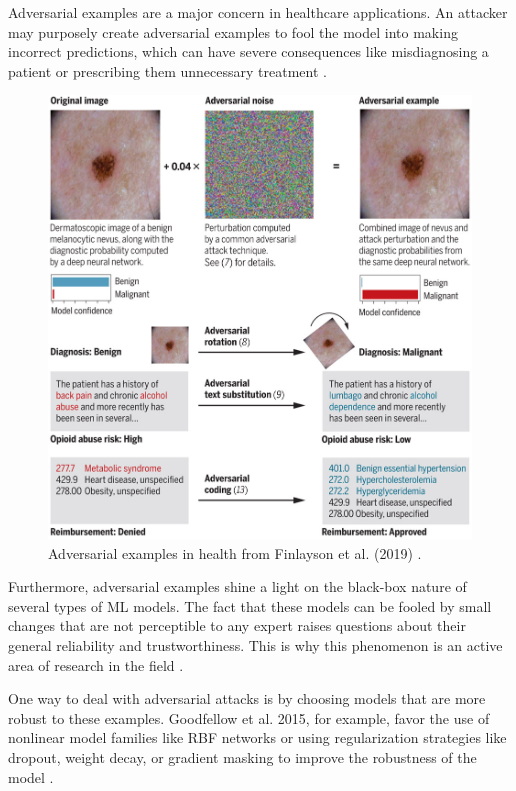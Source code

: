 \documentclass[../main.tex]{subfiles}
\begin{document}
    Adversarial examples are a major concern in healthcare applications. An attacker may purposely create adversarial examples to fool the model into making incorrect predictions, which can have severe consequences like misdiagnosing a patient or prescribing them unnecessary treatment \cite{finlayson_adversarial_2019}. 

    \begin{figure}[h]
        \includegraphics[width=0.65\linewidth]{figures/medical-adversarial-attacks.jpeg}
        \caption{Adversarial examples in health from Finlayson et al. (2019) \cite{finlayson_adversarial_2019}.}
        \label{fig:medical_adversarial_attacks}
    \end{figure}

    Furthermore, adversarial examples shine a light on the black-box nature of several types of ML models. The fact that these models can be fooled by small changes that are not perceptible to any expert raises questions about their general reliability and trustworthiness. This is why this phenomenon is an active area of research in the field \cite{finlayson_adversarial_2019}.

    One way to deal with adversarial attacks is by choosing models that are more robust to these examples. Goodfellow et al. 2015, for example, favor the use of nonlinear model families like RBF networks or using regularization strategies like dropout, weight decay, or gradient masking to improve the robustness of the model \autocite{goodfellowExplainingHarnessingAdversarial2015}.
    
\end{document}
